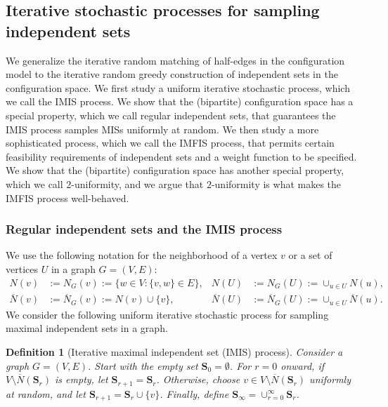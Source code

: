 \documentclass{article}
\theoremstyle{plain}
\theoremstyle{remark}
\theoremstyle{plain}
\newtheorem{definition}[theorem]{Definition}
\numberwithin{equation}{section}
\begin{document}
	\subsection{Iterative stochastic processes for sampling independent sets}
	
	We generalize the iterative random matching of half-edges in the configuration model to the iterative random greedy construction of independent sets in the configuration space. We first study a uniform iterative stochastic process, which we call the IMIS process. We show that the (bipartite) configuration space has a special property, which we call regular independent sets, that guarantees the IMIS process samples MISs uniformly at random. We then study a more sophisticated process, which we call the IMFIS process, that permits certain feasibility requirements of independent sets and a weight function to be specified. We show that the (bipartite) configuration space has another special property, which we call $2$-uniformity, and we argue that $2$-uniformity is what makes the IMFIS process well-behaved.
	
	\subsubsection{Regular independent sets and the IMIS process}\label{subsection_independent_regular}
	
	We use the following notation for the neighborhood of a vertex $v$ or a set of vertices $U$ in a graph $G=(V,E)$:
	\begin{align}
		N(v)&:=N_G(v):=\{w\in V:\{v,w\}\in E\},&N(U)&:=N_G(U):=\cup_{u\in U}N(u),\\
		\overline{N}(v)&:=\overline{N}_G(v):=N(v)\cup\{v\},&\overline{N}(U)&:=\overline{N}_G(U):=\cup_{u\in U}\overline{N}(u).
	\end{align}
	We consider the following uniform iterative stochastic process for sampling maximal independent sets in a graph.
	
	\begin{definition}[Iterative maximal independent set (IMIS) process]
		Consider a graph $G=(V,E)$. Start with the empty set $\boldsymbol{S}_0=\emptyset$. For $r=0$ onward, if $V\setminus\overline{N}(\boldsymbol{S}_r)$ is empty, let $\boldsymbol{S}_{r+1}=\boldsymbol{S}_r$. Otherwise, choose $v\in V\setminus\overline{N}(\boldsymbol{S}_r)$ uniformly at random, and let $\boldsymbol{S}_{r+1}=\boldsymbol{S}_r\cup\{v\}$. Finally, define $\boldsymbol{S}_{\infty}=\cup_{r=0}^{\infty}\boldsymbol{S}_r$.
	\end{definition}
	
\end{document}
